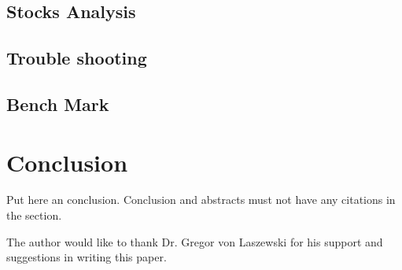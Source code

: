 \subsection{Stocks Analysis}
\subsection{Trouble shooting}
\subsection{Bench Mark}


\section{Conclusion}

Put here an conclusion. Conclusion and abstracts must not have any
citations in the section.


\begin{acks}
The author would like to thank Dr. Gregor von Laszewski for his support and 
suggestions in writing this paper.
\end{acks}






